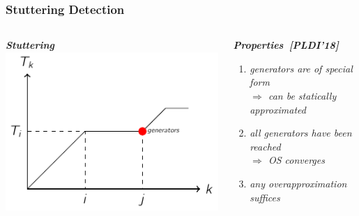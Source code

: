\documentclass[aspectratio=169]{beamer}
\newcommand{\bhand}{\color{blue}{\ding{43}}}
\begin{document}
\begin{frame}
  \frametitle{Stuttering Detection}
  \begin{block}{}
    \begin{columns}
      \begin{column}{0.49\textwidth}
        \begin{center}{\textbf{\textit{Stuttering}}}
          \includegraphics[width=1\textwidth]{figures/generator}
        \end{center}
      \end{column}
      \begin{column}{0.49\textwidth}
        \begin{center}{\textbf{\textit{Properties~[PLDI'18]}}}
          \vskip20pt
          \begin{enumerate}[\bhand]
          \item<1-> \emph{\small{generators are of special form\\ \alert{$\Rightarrow$} can be statically approximated}}
            \vskip25pt
          \item<2-> \emph{\small{all generators have been reached \\ \alert{$\Rightarrow$} OS converges}}
            \vskip25pt
          \item<3> \emph{\small{any overapproximation suffices}}
          \end{enumerate}
        \end{center}
      \end{column}
    \end{columns}
  \end{block}
\end{frame}
\end{document}
